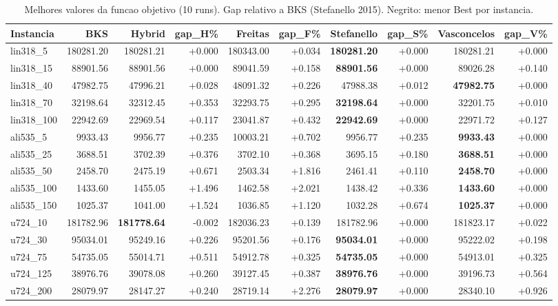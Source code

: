 \begin{table}[!htb]
\centering
\caption{Melhores valores da funcao objetivo (10 runs). Gap relativo a BKS (Stefanello 2015). Negrito: menor Best por instancia.}
\label{tab:best}
\small
\begin{tabular}{lrrrrrrrrr}
\hline
Instancia & BKS & Hybrid & gap\_H\% & Freitas & gap\_F\% & Stefanello & gap\_S\% & Vasconcelos & gap\_V\% \\
\hline
lin318\_5 & 180281.20 & 180281.21 & +0.000 & 180343.00 & +0.034 & \textbf{180281.20} & +0.000 & 180281.21 & +0.000 \\
lin318\_15 & 88901.56 & 88901.56 & +0.000 & 89041.59 & +0.158 & \textbf{88901.56} & +0.000 & 89026.28 & +0.140 \\
lin318\_40 & 47982.75 & 47996.21 & +0.028 & 48091.32 & +0.226 & 47988.38 & +0.012 & \textbf{47982.75} & +0.000 \\
lin318\_70 & 32198.64 & 32312.45 & +0.353 & 32293.75 & +0.295 & \textbf{32198.64} & +0.000 & 32201.75 & +0.010 \\
lin318\_100 & 22942.69 & 22969.54 & +0.117 & 23041.87 & +0.432 & \textbf{22942.69} & +0.000 & 22971.72 & +0.127 \\
ali535\_5 & 9933.43 & 9956.77 & +0.235 & 10003.21 & +0.702 & 9956.77 & +0.235 & \textbf{9933.43} & +0.000 \\
ali535\_25 & 3688.51 & 3702.39 & +0.376 & 3702.10 & +0.368 & 3695.15 & +0.180 & \textbf{3688.51} & +0.000 \\
ali535\_50 & 2458.70 & 2475.19 & +0.671 & 2503.34 & +1.816 & 2461.41 & +0.110 & \textbf{2458.70} & +0.000 \\
ali535\_100 & 1433.60 & 1455.05 & +1.496 & 1462.58 & +2.021 & 1438.42 & +0.336 & \textbf{1433.60} & +0.000 \\
ali535\_150 & 1025.37 & 1041.00 & +1.524 & 1036.85 & +1.120 & 1032.28 & +0.674 & \textbf{1025.37} & +0.000 \\
u724\_10 & 181782.96 & \textbf{181778.64} & -0.002 & 182036.23 & +0.139 & 181782.96 & +0.000 & 181823.17 & +0.022 \\
u724\_30 & 95034.01 & 95249.16 & +0.226 & 95201.56 & +0.176 & \textbf{95034.01} & +0.000 & 95222.02 & +0.198 \\
u724\_75 & 54735.05 & 55014.71 & +0.511 & 54912.78 & +0.325 & \textbf{54735.05} & +0.000 & 54913.01 & +0.325 \\
u724\_125 & 38976.76 & 39078.08 & +0.260 & 39127.45 & +0.387 & \textbf{38976.76} & +0.000 & 39196.73 & +0.564 \\
u724\_200 & 28079.97 & 28147.27 & +0.240 & 28719.14 & +2.276 & \textbf{28079.97} & +0.000 & 28340.10 & +0.926 \\

\end{tabular}
\end{table}
